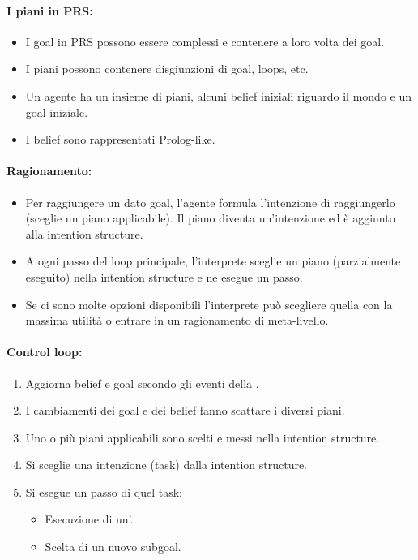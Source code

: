 
\paragraph{I piani in PRS:}

\begin{itemize}
  \item I goal in PRS possono essere complessi e contenere a loro volta dei goal. 
  \item I piani possono contenere disgiunzioni di goal, loops, etc.
  \item Un agente ha un insieme di piani, alcuni belief iniziali riguardo il mondo e un goal iniziale.
  \item I belief sono rappresentati Prolog-like. 
\end{itemize}

\paragraph{Ragionamento:}

\begin{itemize}
  \item Per raggiungere un dato goal, l'agente formula l'intenzione di raggiungerlo (sceglie un piano applicabile). Il piano diventa un'intenzione ed è aggiunto alla intention structure. 
  \item A ogni passo del loop principale, l'interprete sceglie un piano (parzialmente eseguito) nella intention structure e ne esegue un passo. 
  \item Se ci sono molte opzioni disponibili l'interprete può scegliere quella con la massima utilità o entrare in un ragionamento di meta-livello.
\end{itemize}

\paragraph{Control loop:}

\begin{enumerate}
  \item Aggiorna belief e goal secondo gli eventi della . 
  \item I cambiamenti dei goal e dei belief fanno scattare i diversi piani.
  \item Uno o più piani applicabili sono scelti e messi nella intention structure. 
    \item Si sceglie una intenzione (task) dalla intention structure. 
    \item Si esegue un passo di quel task: 
      \begin{itemize}
        \item Esecuzione di un'. 
        \item Scelta di un nuovo subgoal.
      \end{itemize}
\end{enumerate}

